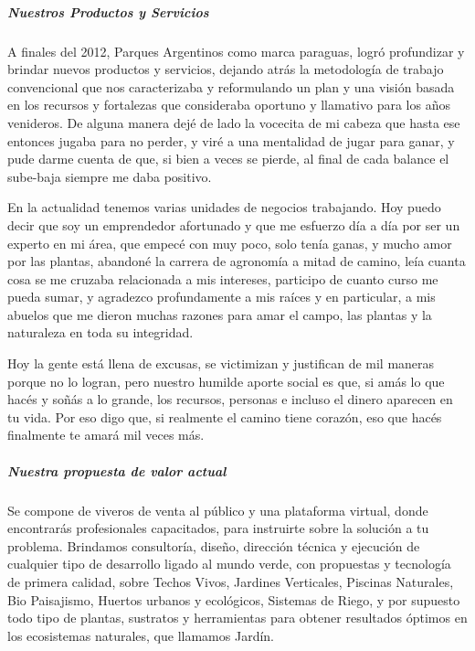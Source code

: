 \documentclass[
]{article}
\begin{document}
\hypertarget{nuestros-productos-y-servicios}{%
\subparagraph{Nuestros Productos y
Servicios}\label{nuestros-productos-y-servicios}}

A finales del 2012, Parques Argentinos como marca paraguas, logró
profundizar y brindar nuevos productos y servicios, dejando atrás la
metodología de trabajo convencional que nos caracterizaba y reformulando
un plan y una visión basada en los recursos y fortalezas que consideraba
oportuno y llamativo para los años venideros. De alguna manera dejé de
lado la vocecita de mi cabeza que hasta ese entonces jugaba para no
perder, y viré a una mentalidad de jugar para ganar, y pude darme cuenta
de que, si bien a veces se pierde, al final de cada balance el sube-baja
siempre me daba positivo.

En la actualidad tenemos varias unidades de negocios trabajando. Hoy
puedo decir que soy un emprendedor afortunado y que me esfuerzo día a
día por ser un experto en mi área, que empecé con muy poco, solo tenía
ganas, y mucho amor por las plantas, abandoné la carrera de agronomía a
mitad de camino, leía cuanta cosa se me cruzaba relacionada a mis
intereses, participo de cuanto curso me pueda sumar, y agradezco
profundamente a mis raíces y en particular, a mis abuelos que me dieron
muchas razones para amar el campo, las plantas y la naturaleza en toda
su integridad.

Hoy la gente está llena de excusas, se victimizan y justifican de mil
maneras porque no lo logran, pero nuestro humilde aporte social es que,
si amás lo que hacés y soñás a lo grande, los recursos, personas e
incluso el dinero aparecen en tu vida. Por eso digo que, si realmente el
camino tiene corazón, eso que hacés finalmente te amará mil veces más.

\hypertarget{nuestra-propuesta-de-valor-actual}{%
\subparagraph{Nuestra propuesta de valor
actual}\label{nuestra-propuesta-de-valor-actual}}

Se compone de viveros de venta al público y una plataforma virtual,
donde encontrarás profesionales capacitados, para instruirte sobre la
solución a tu problema. Brindamos consultoría, diseño, dirección técnica
y ejecución de cualquier tipo de desarrollo ligado al mundo verde, con
propuestas y tecnología de primera calidad, sobre Techos Vivos, Jardines
Verticales, Piscinas Naturales, Bio Paisajismo, Huertos urbanos y
ecológicos, Sistemas de Riego, y por supuesto todo tipo de plantas,
sustratos y herramientas para obtener resultados óptimos en los
ecosistemas naturales, que llamamos Jardín.
\end{document}
